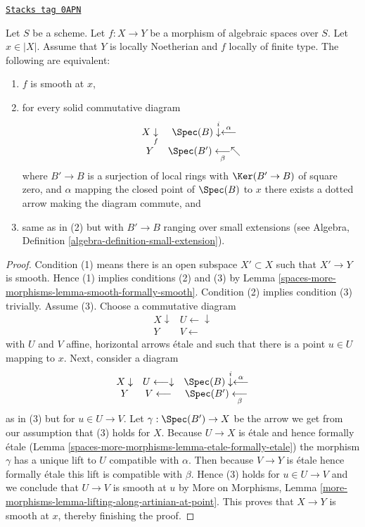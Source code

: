 \begin{lemma}
\label{spaces-more-morphisms-lemma-lifting-along-artinian-at-point}
\href{https://stacks.math.columbia.edu/tag/0APN}{\texttt{Stacks tag 0APN}}

Let $S$ be a scheme. Let $f : X \to Y$ be a morphism of algebraic spaces
over $S$. Let $x \in |X|$.
Assume that $Y$ is locally Noetherian and $f$ locally of finite type.
The following are equivalent:
\begin{enumerate}
\item $f$ is smooth at $x$,
\item for every solid commutative diagram
$$
\begin{array}{cc}X \underset{f}{\downarrow} & \Spec(B) \overset{i}{\downarrow}\overset{\alpha}{\longleftarrow} \\ Y & \Spec(B') \underset{\beta}{\longleftarrow}\nwarrow\end{array}
$$
where $B' \to B$ is a surjection of local rings with
$\Ker(B' \to B)$ of square zero, and $\alpha$ mapping the
closed point of $\Spec(B)$ to $x$ there exists
a dotted arrow making the diagram commute, and
\item same as in (2) but with $B' \to B$ ranging over small
extensions (see Algebra, Definition \ref{algebra-definition-small-extension}).
\end{enumerate}
\end{lemma}

\begin{proof}
Condition (1) means there is an open subspace $X' \subset X$
such that $X' \to Y$ is smooth. Hence (1) implies conditions (2) and (3) by
Lemma \ref{spaces-more-morphisms-lemma-smooth-formally-smooth}. Condition (2) implies
condition (3) trivially. Assume (3). Choose a commutative diagram
$$
\begin{array}{cc}X \downarrow & U \longleftarrow\downarrow \\ Y & V \longleftarrow\end{array}
$$
with $U$ and $V$ affine, horizontal arrows \'etale and
such that there is a point $u \in U$ mapping to $x$. Next, consider
a diagram
$$
\begin{array}{ccc}X \downarrow & U \longleftarrow\downarrow & \Spec(B) \overset{i}{\downarrow}\overset{\alpha}{\longleftarrow} \\ Y & V \longleftarrow & \Spec(B') \underset{\beta}{\longleftarrow}\end{array}
$$
as in (3) but for $u \in U \to V$. Let $\gamma : \Spec(B') \to X$
be the arrow we get from our assumption that (3) holds for $X$.
Because $U \to X$ is \'etale and
hence formally \'etale (Lemma \ref{spaces-more-morphisms-lemma-etale-formally-etale})
the morphism $\gamma$
has a unique lift to $U$ compatible with $\alpha$. Then because
$V \to Y$ is \'etale hence formally \'etale this lift is compatible
with $\beta$. Hence (3) holds for $u \in U \to V$ and we conclude
that $U \to V$ is smooth at $u$ by
More on Morphisms, Lemma
\ref{more-morphisms-lemma-lifting-along-artinian-at-point}.
This proves that $X \to Y$ is smooth at $x$, thereby
finishing the proof.
\end{proof}

